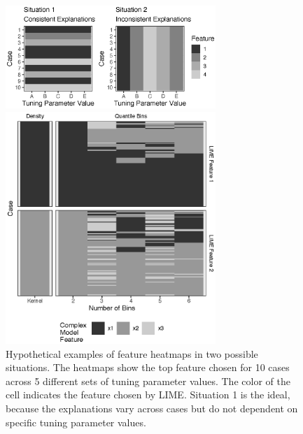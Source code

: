\documentclass[AMS,STIX2COL]{WileyNJD-v2}\usepackage[]{graphicx}\usepackage[]{color}
\newenvironment{knitrout}{}{} %
\begin{document}
\begin{figure}[!thp]
\begin{knitrout}
\color{fgcolor}

{\centering \includegraphics[width=3.125in]{figure-05-1} 

}



\end{knitrout}
\caption{Hypothetical examples of feature heatmaps in two possible situations. The heatmaps show the top feature chosen for 10 cases across 5 different sets of tuning parameter values. The color of the cell indicates the feature chosen by LIME. Situation 1 is the ideal, because the explanations vary across cases but do not dependent on specific tuning parameter values.}
\label{fig:figure-05}

\vspace*{\floatsep}

\begin{knitrout}
\color{fgcolor}

{\centering \includegraphics[width=3.125in]{figure-06-1} 

}




\end{knitrout}
\end{figure}
\end{document}
